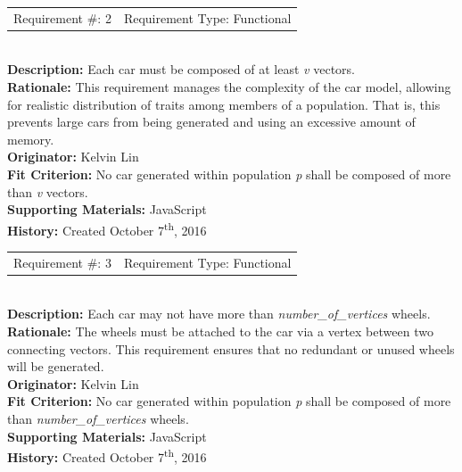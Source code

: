 \documentclass[12pt, titlepage]{article}
\begin{document}
\begin{reqbox}
%
\begin{tabular}{cc}
Requirement \#: 2 & Requirement Type: Functional \\
\end{tabular} \\
%
\textbf{Description:} Each car must be composed of at least \textit{v} vectors. 
\\
\textbf{Rationale:}  This requirement manages the complexity of the car model, 
allowing for realistic distribution of traits among members of a population. 
That is, this prevents large cars from being generated and using an excessive 
amount of memory. \\
\textbf{Originator:} Kelvin Lin\\
\textbf{Fit Criterion:} No car generated within population \textit{p} shall be 
composed of more than \textit{v} vectors.\\
%  
\textbf{Supporting Materials:} JavaScript \\
\textbf{History:} Created October 7\textsuperscript{th}, 2016
%
\end{reqbox}

\newpage

\begin{reqbox}
%
\begin{tabular}{cc}
Requirement \#: 3 & Requirement Type: Functional \\
\end{tabular} \\
%
\textbf{Description:} Each car may not have more than 
\textit{number\_of\_vertices} wheels. \\
\textbf{Rationale:}  The wheels must be attached to the car via a vertex between 
two connecting vectors. This requirement ensures that no redundant or unused 
wheels will be generated.\\
\textbf{Originator:} Kelvin Lin\\
\textbf{Fit Criterion:} No car generated within population \textit{p} shall be 
composed of more than \textit{number\_of\_vertices} wheels.\\
%  
\textbf{Supporting Materials:} JavaScript \\
\textbf{History:} Created October 7\textsuperscript{th}, 2016
%
\end{reqbox}
\end{document}
